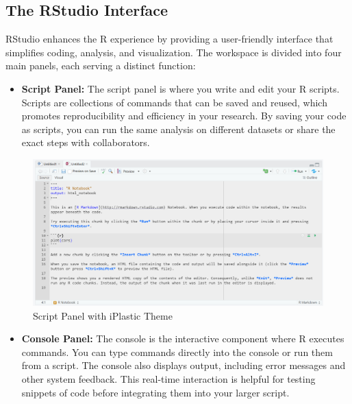 \documentclass[
]{book}
\providecommand{\tightlist}{%
  \setlength{\itemsep}{0pt}\setlength{\parskip}{0pt}}
\begin{document}
\subsection*{The RStudio Interface}\label{the-rstudio-interface}

RStudio enhances the R experience by providing a user-friendly interface that simplifies coding, analysis, and visualization. The workspace is divided into four main panels, each serving a distinct function:

\begin{itemize}
\tightlist
\item
  \textbf{Script Panel:} The script panel is where you write and edit your R scripts. Scripts are collections of commands that can be saved and reused, which promotes reproducibility and efficiency in your research. By saving your code as scripts, you can run the same analysis on different datasets or share the exact steps with collaborators.
\end{itemize}

\begin{figure}
\centering
\includegraphics[width=1\textwidth,height=\textheight]{images/script-panel.png}
\caption{Script Panel with iPlastic Theme}
\end{figure}

\begin{itemize}
\tightlist
\item
  \textbf{Console Panel:} The console is the interactive component where R executes commands. You can type commands directly into the console or run them from a script. The console also displays output, including error messages and other system feedback. This real-time interaction is helpful for testing snippets of code before integrating them into your larger script.
\end{itemize}
\end{document}
